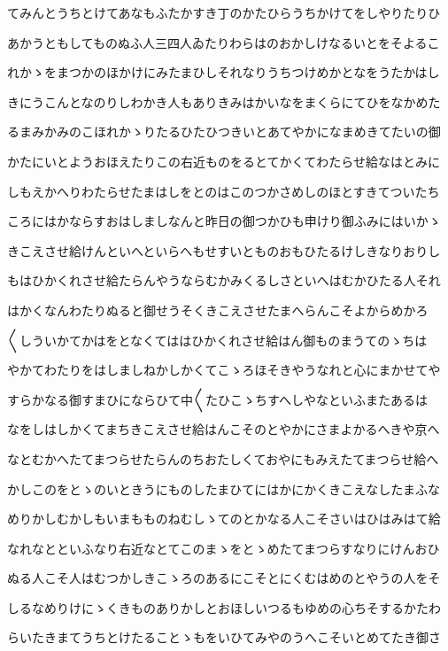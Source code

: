\documentclass[a4paper,11pt,landscape]{ltjtarticle}
\begin{document}
てみんとうちとけてあなもふたかすき丁のかたひらうちかけてをしやりたりひ
\par\medskip
あかうともしてものぬふ人三四人ゐたりわらはのおかしけなるいとをそよるこ
\par\medskip
れかゝをまつかのほかけにみたまひしそれなりうちつけめかとなをうたかはし
\par\medskip
きにうこんとなのりしわかき人もありきみはかいなをまくらにてひをなかめた
\par\medskip
るまみかみのこほれかゝりたるひたひつきいとあてやかになまめきてたいの御
\par\medskip
かたにいとようおほえたりこの右近ものをるとてかくてわたらせ給なはとみに
\par\medskip
しもえかへりわたらせたまはしをとのはこのつかさめしのほとすきてついたち
\par\medskip
ころにはかならすおはしましなんと昨日の御つかひも申けり御ふみにはいかゝ
\par\medskip
きこえさせ給けんといへといらへもせすいとものおもひたるけしきなりおりし
\par\medskip
もはひかくれさせ給たらんやうならむかみくるしさといへはむかひたる人それ
\par\medskip
はかくなんわたりぬると御せうそくきこえさせたまへらんこそよからめかろ
\par\medskip
〱しういかてかはをとなくてははひかくれさせ給はん御ものまうてのゝちは
\par\medskip
やかてわたりをはしましねかしかくてこゝろほそきやうなれと心にまかせてや
\par\medskip
すらかなる御すまひにならひて中〱たひこゝちすへしやなといふまたあるは
\par\medskip
なをしはしかくてまちきこえさせ給はんこそのとやかにさまよかるへきや京へ
\par\medskip
なとむかへたてまつらせたらんのちおたしくておやにもみえたてまつらせ給へ
\par\medskip
かしこのをとゝのいときうにものしたまひてにはかにかくきこえなしたまふな
\par\medskip
めりかしむかしもいまもものねむしゝてのとかなる人こそさいはひはみはて給
\par\medskip
なれなとといふなり右近なとてこのまゝをとゝめたてまつらすなりにけんおひ
\par\medskip
ぬる人こそ人はむつかしきこゝろのあるにこそとにくむはめのとやうの人をそ
\par\medskip
しるなめりけにゝくきものありかしとおほしいつるもゆめの心ちそするかたわ
\par\medskip
らいたきまてうちとけたることゝもをいひてみやのうへこそいとめてたき御さ
\end{document}
